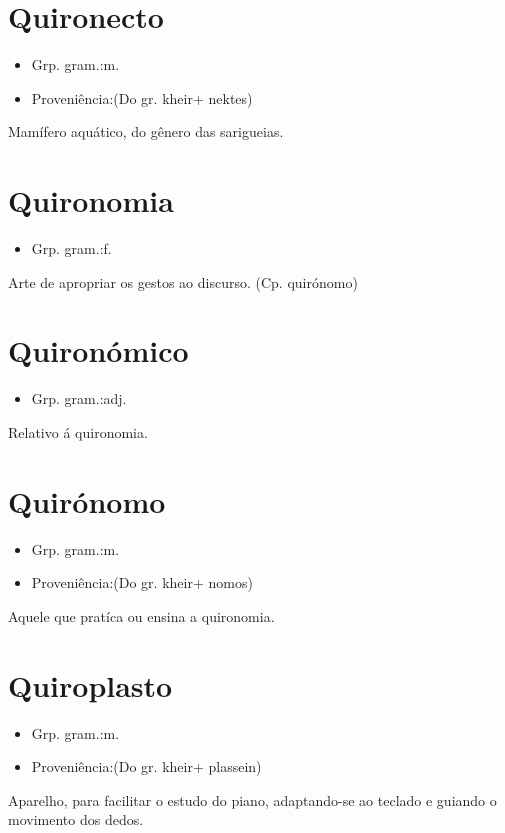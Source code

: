 \section{Quironecto}
\begin{itemize}
\item {Grp. gram.:m.}
\end{itemize}
\begin{itemize}
\item {Proveniência:(Do gr. \textunderscore kheir\textunderscore  + \textunderscore nektes\textunderscore )}
\end{itemize}
Mamífero aquático, do gênero das sarigueias.
\section{Quironomia}
\begin{itemize}
\item {Grp. gram.:f.}
\end{itemize}
Arte de apropriar os gestos ao discurso.
(Cp. \textunderscore quirónomo\textunderscore )
\section{Quironómico}
\begin{itemize}
\item {Grp. gram.:adj.}
\end{itemize}
Relativo á quironomia.
\section{Quirónomo}
\begin{itemize}
\item {Grp. gram.:m.}
\end{itemize}
\begin{itemize}
\item {Proveniência:(Do gr. \textunderscore kheir\textunderscore  + \textunderscore nomos\textunderscore )}
\end{itemize}
Aquele que pratíca ou ensina a quironomia.
\section{Quiroplasto}
\begin{itemize}
\item {Grp. gram.:m.}
\end{itemize}
\begin{itemize}
\item {Proveniência:(Do gr. \textunderscore kheir\textunderscore  + \textunderscore plassein\textunderscore )}
\end{itemize}
Aparelho, para facilitar o estudo do piano, adaptando-se ao teclado e guiando o movimento dos dedos.
